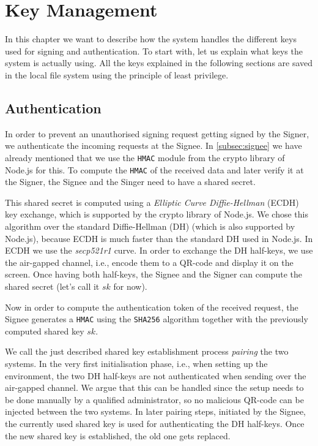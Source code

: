 \chapter{Key Management}\label{chapter:key_management}
In this chapter we want to describe how the system handles the different keys used for signing and authentication. To start with, let us explain what keys the system is actually using. All the keys explained in the following sections are saved in the local file system using the principle of least privilege.


\section{Authentication}
In order to prevent an unauthorised signing request getting signed by the Signer, we authenticate the incoming requests at the Signee. In \autoref{subsec:signee} we have already mentioned that we use the \texttt{HMAC} module from the crypto library of Node.js for this. To compute the \texttt{HMAC} of the received data and later verify it at the Signer, the Signee and the Singer need to have a shared secret.

This shared secret is computed using a \emph{Elliptic Curve Diffie-Hellman} (ECDH) key exchange, which is supported by the crypto library of Node.js. We chose this algorithm over the standard Diffie-Hellman (DH) (which is also supported by Node.js), because ECDH is much faster than the standard DH used in Node.js. In ECDH we use the \emph{secp521r1} curve. In order to exchange the DH half-keys, we use the air-gapped channel, i.e., encode them to a QR-code and display it on the screen. Once having both half-keys, the Signee and the Signer can compute the shared secret (let's call it $sk$ for now).

Now in order to compute the authentication token of the received request, the Signee generates a \texttt{HMAC} using the \texttt{SHA256} algorithm together with the previously computed shared key $sk$.

We call the just described shared key establishment process \emph{pairing} the two systems. In the very first initialisation phase, i.e., when setting up the environment, the two DH half-keys are not authenticated when sending over the air-gapped channel. We argue that this can be handled since the setup needs to be done manually by a qualified administrator, so no malicious QR-code can be injected between the two systems. In later pairing steps, initiated by the Signee, the currently used shared key is used for authenticating the DH half-keys. Once the new shared key is established, the old one gets replaced.

